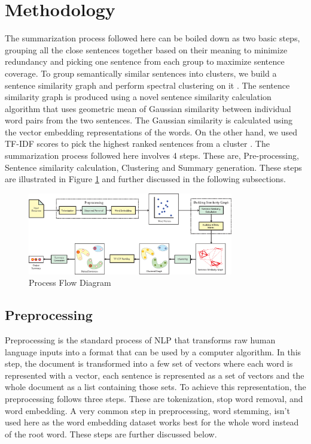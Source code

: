 \documentclass[acmlarge]{acmart}
\begin{document}
\section{Methodology}\label{sec:methodology}
The summarization process followed here can be boiled down as two basic steps, grouping all the close sentences together based on their meaning to minimize redundancy and picking one sentence from each group to maximize sentence coverage. To group semantically similar sentences into clusters, we build a sentence similarity graph and perform spectral clustering on it \cite{roychowdhury-etal-2022-spectral-base}. The sentence similarity graph is produced using a novel sentence similarity calculation algorithm that uses geometric mean of Gaussian similarity between individual word pairs from the two sentences. The Gaussian similarity is calculated using the vector embedding representations of the words. On the other hand, we used TF-IDF scores to pick the highest ranked sentences from a cluster \cite{Akter-2017-tfidf-3, das-2022-tfidf, sarkar-2012-tfidf, sarkar-2012-tfidf-2}. The summarization process followed here involves 4 steps. These are, Pre-processing, Sentence similarity calculation, Clustering and Summary generation. These steps are illustrated in Figure \ref{fig:process-flow-diagram} and further discussed in the following subsections. 
\begin{figure}
	\centering
	\includegraphics[width=0.8\textwidth]{figs/process-flow-diagram-new}
	\caption{Process Flow Diagram}
	\label{fig:process-flow-diagram}
\end{figure}
\subsection{Preprocessing}\label{subsec:preprocessing}
Preprocessing is the standard process of NLP that transforms raw human language inputs into a format that can be used by a computer algorithm. In this step, the document is transformed into a few set of vectors where each word is represented with a vector, each sentence is represented as a set of vectors and the whole document as a list containing those sets. To achieve this representation, the preprocessing follows three steps. These are tokenization, stop word removal, and word embedding. A very common step in preprocessing, word stemming, isn't used here as the word embedding dataset works best for the whole word instead of the root word. These steps are further discussed below.
\end{document}
